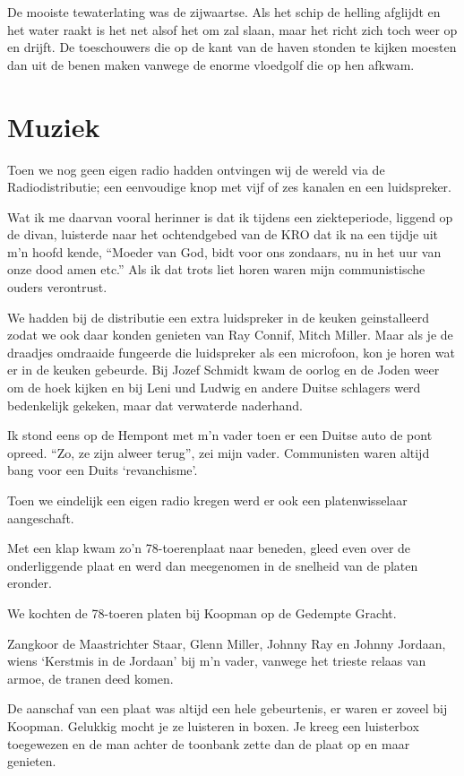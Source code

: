 \documentclass[10pt,twoside,openright]{memoir}
\begin{document}
De mooiste tewaterlating was de zijwaartse. Als het schip de helling afglijdt en het water raakt is het net alsof het om zal slaan, maar het richt zich toch weer op en drijft. De toeschouwers die op de kant van de haven stonden te kijken moesten dan uit de benen maken vanwege de enorme vloedgolf die op hen afkwam.

\chapter{Muziek} %
\label{cha:muziek}

Toen we nog geen eigen radio hadden ontvingen wij de wereld via de Radiodistributie; een eenvoudige knop met vijf of zes kanalen en een luidspreker. 

Wat ik me daarvan vooral herinner is dat ik tijdens een ziekteperiode, liggend op de divan, luisterde naar het ochtendgebed van de KRO dat ik na een tijdje uit m’n hoofd kende, ``Moeder van God, bidt voor ons zondaars, nu in het uur van onze dood amen etc.'' Als ik dat trots liet horen waren mijn communistische ouders verontrust. 

We hadden bij de distributie een extra luidspreker in de keuken geinstalleerd zodat we ook daar konden genieten van Ray Connif, Mitch Miller. Maar als je de draadjes omdraaide fungeerde die luidspreker als een microfoon, kon je horen wat er in de keuken gebeurde. Bij Jozef Schmidt kwam de oorlog en de Joden weer om de hoek kijken en bij Leni und Ludwig en andere Duitse schlagers werd bedenkelijk gekeken, maar dat verwaterde naderhand. 

Ik stond eens op de Hempont met m’n vader toen er een Duitse auto de pont opreed. ``Zo, ze zijn alweer terug'', zei mijn vader. Communisten waren altijd bang voor een Duits ‘revanchisme’.

Toen we eindelijk een eigen radio kregen werd er ook een platenwisselaar aangeschaft. 

Met een klap kwam zo’n 78-toerenplaat naar beneden, gleed even over de onderliggende plaat en werd dan meegenomen in de snelheid van de platen eronder. 

We kochten de 78-toeren platen bij Koopman op de Gedempte Gracht. 

Zangkoor de Maastrichter Staar, Glenn Miller, Johnny Ray en Johnny Jordaan, wiens ‘Kerstmis in de Jordaan’ bij m’n vader, vanwege het trieste relaas van armoe, de tranen deed komen. 

De aanschaf van een plaat was altijd een hele gebeurtenis, er waren er zoveel bij Koopman. Gelukkig mocht je ze luisteren in boxen. Je kreeg een luisterbox toegewezen en de man achter de toonbank zette dan de plaat op en maar genieten. 
\end{document}
